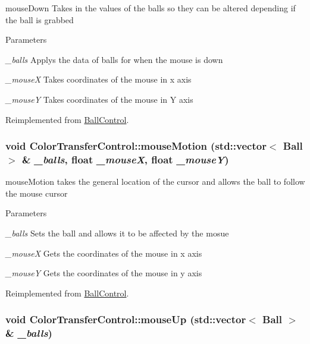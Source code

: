 mouseDown Takes in the values of the balls so they can be altered depending if the ball is grabbed 
\begin{DoxyParams}{Parameters}
\item[{\em \_\-balls}]Applys the data of balls for when the mouse is down \item[{\em \_\-mouseX}]Takes coordinates of the mouse in x axis \item[{\em \_\-mouseY}]Takes coordinates of the mouse in Y axis \end{DoxyParams}


Reimplemented from \hyperlink{classBallControl_a1ba25b7c58a9a6ec39ca54daa9e1f488}{BallControl}.\hypertarget{classColorTransferControl_a84567646b6a7d814aa8de8660da69543}{
\subsubsection[{mouseMotion}]{\setlength{\rightskip}{0pt plus 5cm}void ColorTransferControl::mouseMotion (std::vector$<$ {\bf Ball} $>$ \& {\em \_\-balls}, \/  float {\em \_\-mouseX}, \/  float {\em \_\-mouseY})}}
\label{classColorTransferControl_a84567646b6a7d814aa8de8660da69543}


mouseMotion takes the general location of the cursor and allows the ball to follow the mouse cursor 
\begin{DoxyParams}{Parameters}
\item[{\em \_\-balls}]Sets the ball and allows it to be affected by the mosue \item[{\em \_\-mouseX}]Gets the coordinates of the mouse in x axis \item[{\em \_\-mouseY}]Gets the coordinates of the mouse in y axis \end{DoxyParams}


Reimplemented from \hyperlink{classBallControl_a18a2fcfe219f8f28319d8f9dcb2bee77}{BallControl}.\hypertarget{classColorTransferControl_a335ef9511d0cacec325a154c106bb1da}{
\subsubsection[{mouseUp}]{\setlength{\rightskip}{0pt plus 5cm}void ColorTransferControl::mouseUp (std::vector$<$ {\bf Ball} $>$ \& {\em \_\-balls})}}
\label{classColorTransferControl_a335ef9511d0cacec325a154c106bb1da}


